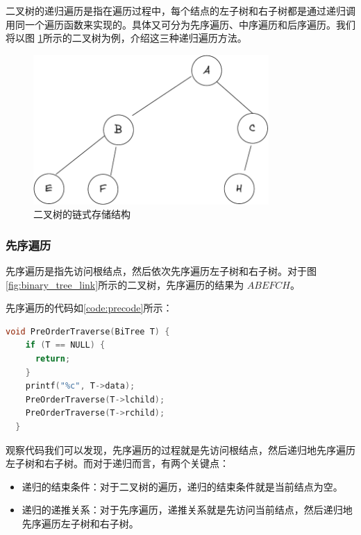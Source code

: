 \documentclass[lang=cn,newtx,10pt,scheme=chinese]{elegantbook}
\begin{document}
二叉树的递归遍历是指在遍历过程中，每个结点的左子树和右子树都是通过递归调用同一个遍历函数来实现的。具体又可分为先序遍历、中序遍历和后序遍历。我们将以图
\ref{fig:one_binary_tree_link}所示的二叉树为例，介绍这三种递归遍历方法。

\begin{figure}
  \centering
  \includegraphics[width=0.8\textwidth]{./figure/pdf/cropped/oneBTree.pdf}
  \caption{二叉树的链式存储结构}
  \label{fig:one_binary_tree_link}
\end{figure}

\subsubsection{先序遍历}

先序遍历是指先访问根结点，然后依次先序遍历左子树和右子树。对于图\ref{fig:binary_tree_link}所示的二叉树，先序遍历的结果为 $ABEFCH$。

先序遍历的代码如\ref{code:precode}所示：

\begin{lstlisting}[language=C++, caption={先序遍历}, label={code:precode}]
  void PreOrderTraverse(BiTree T) {
    if (T == NULL) {
      return;
    }
    printf("%c", T->data);
    PreOrderTraverse(T->lchild);
    PreOrderTraverse(T->rchild);
  }
\end{lstlisting}

观察代码我们可以发现，先序遍历的过程就是先访问根结点，然后递归地先序遍历左子树和右子树。而对于递归而言，有两个关键点：

\begin{itemize}
  \item 递归的结束条件：对于二叉树的遍历，递归的结束条件就是当前结点为空。
  \item 递归的递推关系：对于先序遍历，递推关系就是先访问当前结点，然后递归地先序遍历左子树和右子树。
  \end{itemize}
\end{document}
